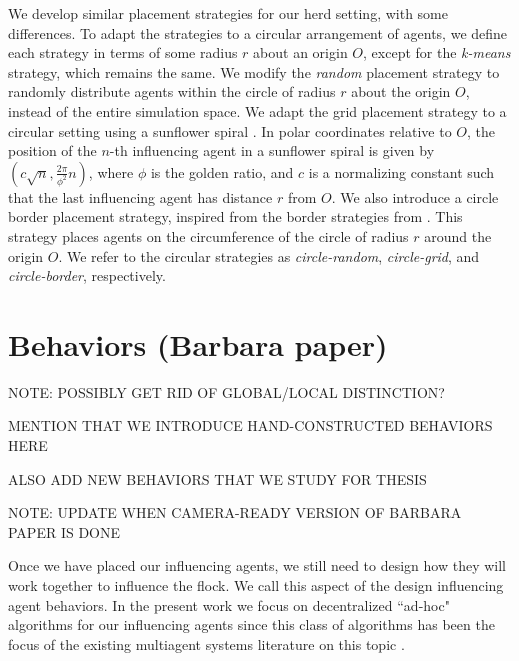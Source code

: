 We develop similar placement strategies for our herd setting, with some
differences.
To adapt the strategies to a circular arrangement of agents, we define each
strategy in terms of some radius $r$ about an origin $O$, except for the
\textit{k-means} strategy, which remains the same.
We modify the \textit{random} placement strategy to randomly distribute agents
within the circle of radius $r$ about the origin $O$, instead of the entire
simulation space.
We adapt the grid placement strategy to a circular setting using a sunflower
spiral \cite{segermansunflower}.
In polar coordinates relative to $O$, the position of the $n$-th influencing
agent in a sunflower spiral is given by $(c\sqrt{n}, \frac{2\pi}{\phi^2}n)$,
where $\phi$ is the golden ratio, and $c$ is a normalizing constant such that
the last influencing agent has distance $r$ from $O$.
We also introduce a circle border placement strategy, inspired from the border
strategies from \cite{genter2015placement}.
This strategy places agents on the circumference of the circle of radius $r$
around the origin $O$.
We refer to the circular strategies as \textit{circle-random},
\textit{circle-grid}, and \textit{circle-border}, respectively.

\section{Behaviors (Barbara paper)}
NOTE: POSSIBLY GET RID OF GLOBAL/LOCAL DISTINCTION?

MENTION THAT WE INTRODUCE HAND-CONSTRUCTED BEHAVIORS HERE

ALSO ADD NEW BEHAVIORS THAT WE STUDY FOR THESIS

NOTE: UPDATE WHEN CAMERA-READY VERSION OF BARBARA PAPER IS DONE

Once we have placed our influencing agents, we still need to design how they
will work together to influence the flock.
We call this aspect of the design influencing agent behaviors.
In the present work we focus on decentralized ``ad-hoc" algorithms for our
influencing agents since this class of algorithms has been the focus of the
existing multiagent systems literature on this topic
\cite{genterthesis, genter2014neighborsorientherd, genter201612steplookahead}.

